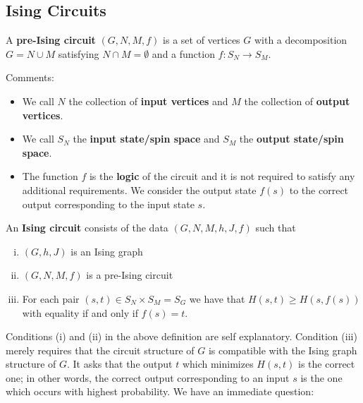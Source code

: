 \documentclass[raggedright, nofonts, notitlepage, openany, debug]{tufte-book}
\begin{document}
\subsection{Ising Circuits}
\begin{defn}
  A \textbf{pre-Ising circuit} $(G,N,M,f)$ is a set of vertices $G$ with a decomposition $G = N \cup M$ satisfying $N \cap M = \emptyset$ and a function $f:S_N\to S_M$.
\end{defn}
Comments:
\begin{itemize}
  \item We call $N$ the collection of \textbf{input vertices} and $M$ the collection of \textbf{output vertices}.
  \item We call $S_N$ the \textbf{input state/spin space} and $S_M$ the \textbf{output state/spin space}.
  \item The function $f$ is the \textbf{logic} of the circuit and it is not required to satisfy any additional requirements. We consider the output state $f(s)$ to the correct output corresponding to the input state $s$.
\end{itemize}
\begin{defn}
  An \textbf{Ising circuit} consists of the data $(G,N,M,h,J,f)$ such that
  \begin{enumerate}[(i)]
    \item $(G,h,J)$ is an Ising graph
    \item $(G,N,M,f)$ is a  pre-Ising circuit
    \item For each pair $(s,t) \in S_N\times S_M = S_G$ we have that $H(s,t) \geq H(s,f(s))$ with equality if and only if $f(s) = t$.
  \end{enumerate}
\end{defn}
Conditions (i) and (ii) in the above definition are self explanatory. Condition (iii) merely requires that the circuit structure of $G$ is compatible with the Ising graph structure of $G$. It asks that the output $t$ which minimizes $H(s,t)$ is the correct one; in other words, the correct output corresponding to an input $s$ is the one which occurs with highest probability. We have an immediate question:
\end{document}
